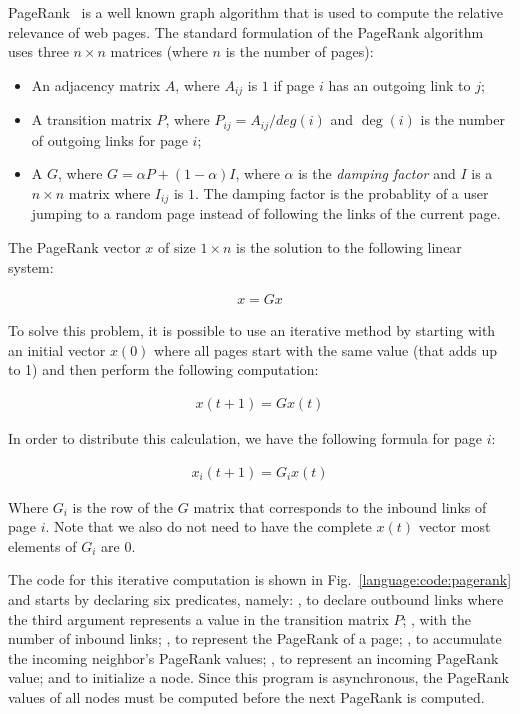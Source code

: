PageRank~\cite{Page:2001:MNR} is a well known graph algorithm that is used to
compute the relative relevance of web pages. The standard formulation of the
PageRank algorithm uses three $n \times n$ matrices (where $n$ is the number of
pages):

\begin{itemize}

   \item An adjacency matrix $A$, where $A_{ij}$ is $1$ if page $i$ has an
      outgoing link to $j$;

   \item A transition matrix $P$, where $P_{ij} = A_{ij}/deg(i)$ and $\deg(i)$
      is the number of outgoing links for page $i$;

   \item A  $G$, where $G = \alpha P + (1-\alpha)I$, where
      $\alpha$ is the \emph{damping factor} and $I$ is a $n \times n$ matrix
      where $I_{ij}$ is $1$. The damping factor is the probablity of a user
      jumping to a random page instead of following the links of the current
      page.

\end{itemize}

The PageRank vector $x$ of size $1 \times n$ is the solution to the following
linear system:

\begin{align}
x = G x
\end{align}

To solve this problem, it is possible to use an iterative method by starting
with an initial vector $x(0)$ where all pages start with the same value (that
adds up to 1) and then perform the following computation:

\begin{align}
x(t + 1) = G x(t)
\end{align}

In order to distribute this calculation, we have the following formula for page
$i$:

\begin{align}
x_{i}(t + 1) = G_{i} x(t)\label{eq:language:pagerank}
\end{align}

Where $G_{i}$ is the row of the $G$ matrix that corresponds to the inbound links
of page $i$. Note that we also do not need to have the complete $x(t)$ vector
most elements of $G_{i}$ are $0$.

The code for this iterative computation is shown in
Fig.~\ref{language:code:pagerank} and starts by declaring six predicates,
namely: , to declare outbound links where the third argument
represents a value in the transition matrix $P$; , with the
number of inbound links; , to represent the PageRank of a page;
, to accumulate the incoming neighbor's PageRank values;
, to represent an incoming PageRank value; and
 to initialize a node.  Since this program is asynchronous, the
PageRank values of all nodes must be computed before the next PageRank is
computed.

